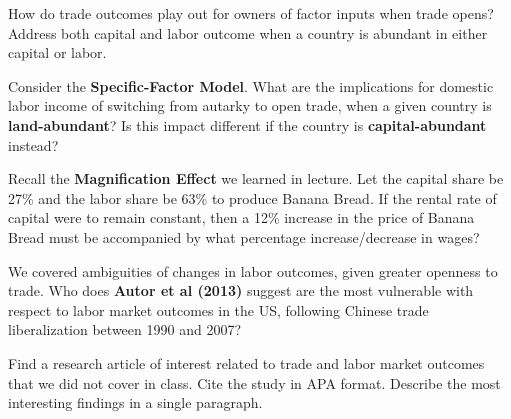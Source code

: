 \documentclass[12pt]{exam}
\begin{document}
\begin{questions}

\newpage 

\question[6]
How do trade outcomes play out for owners of factor inputs when trade opens? 
Address both capital and labor outcome when a country is abundant in either capital or labor.

\question[4]
Consider the \textbf{Specific-Factor Model}. 
What are the implications for domestic labor income of switching from autarky to open trade, when a given country is \textbf{land-abundant}?
Is this impact different if the country is \textbf{capital-abundant} instead?

\newpage 

\question[6]
Recall the \textbf{Magnification Effect} we learned in lecture.
Let the capital share be 27\% and the labor share be 63\% to produce Banana Bread.
If the rental rate of capital were to remain constant, then a 12\% increase in the price of Banana Bread must be accompanied by what percentage increase/decrease in wages?

\question[4]
We covered ambiguities of changes in labor outcomes, given greater openness to trade. 
Who does \textbf{Autor et al (2013)} suggest are the most vulnerable with respect to labor market outcomes in the US, following Chinese trade liberalization between 1990 and 2007?

\question[4]
Find a research article of interest related to trade and labor market outcomes that we did not cover in class.
Cite the study in APA format. 
Describe the most interesting findings in a single paragraph.

\end{questions}
\end{document}
